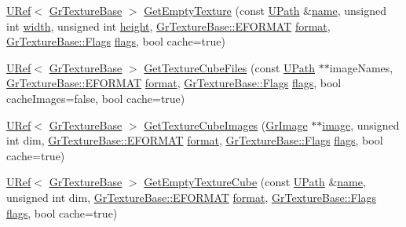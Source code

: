 \begin{CompactItemize}
\item 
\hyperlink{class_u_ref}{URef}$<$ \hyperlink{class_gr_texture_base}{GrTextureBase} $>$ \hyperlink{class_gr_texture_mgr_8cc9e107fe42053e462f63db1f48422c}{GetEmptyTexture} (const \hyperlink{class_u_path}{UPath} \&\hyperlink{glext__bak_8h_bb62efe59ccdd153ce42e1a418352209}{name}, unsigned int \hyperlink{wglext_8h_e6531b1788ca42a9ae8155b0c52e7630}{width}, unsigned int \hyperlink{wglext_8h_b2e63df950c3789599e1e43f477bc9e3}{height}, \hyperlink{class_gr_texture_base_82c606022e93566ba55fe4cd3beb687c}{GrTextureBase::EFORMAT} \hyperlink{glext__bak_8h_e2d3db041c6004a67047659b42f73a44}{format}, \hyperlink{class_gr_texture_base_bee6ecbc7a70ea5f2acab8341a9696b5}{GrTextureBase::Flags} \hyperlink{_u_t_message_8h_0a3c0b351ab09281b662a9ff4f900a53}{flags}, bool cache=true)
\item 
\hyperlink{class_u_ref}{URef}$<$ \hyperlink{class_gr_texture_base}{GrTextureBase} $>$ \hyperlink{class_gr_texture_mgr_cce335f8def2910986ab5b7b2e4a02c6}{GetTextureCubeFiles} (const \hyperlink{class_u_path}{UPath} $\ast$$\ast$imageNames, \hyperlink{class_gr_texture_base_82c606022e93566ba55fe4cd3beb687c}{GrTextureBase::EFORMAT} \hyperlink{glext__bak_8h_e2d3db041c6004a67047659b42f73a44}{format}, \hyperlink{class_gr_texture_base_bee6ecbc7a70ea5f2acab8341a9696b5}{GrTextureBase::Flags} \hyperlink{_u_t_message_8h_0a3c0b351ab09281b662a9ff4f900a53}{flags}, bool cacheImages=false, bool cache=true)
\item 
\hyperlink{class_u_ref}{URef}$<$ \hyperlink{class_gr_texture_base}{GrTextureBase} $>$ \hyperlink{class_gr_texture_mgr_23e061dceb24e232264beef4ad1de42b}{GetTextureCubeImages} (\hyperlink{class_gr_image}{GrImage} $\ast$$\ast$\hyperlink{glext__bak_8h_8943555672bc4b8056204eb92329cafa}{image}, unsigned int dim, \hyperlink{class_gr_texture_base_82c606022e93566ba55fe4cd3beb687c}{GrTextureBase::EFORMAT} \hyperlink{glext__bak_8h_e2d3db041c6004a67047659b42f73a44}{format}, \hyperlink{class_gr_texture_base_bee6ecbc7a70ea5f2acab8341a9696b5}{GrTextureBase::Flags} \hyperlink{_u_t_message_8h_0a3c0b351ab09281b662a9ff4f900a53}{flags}, bool cache=true)
\item 
\hyperlink{class_u_ref}{URef}$<$ \hyperlink{class_gr_texture_base}{GrTextureBase} $>$ \hyperlink{class_gr_texture_mgr_801ca4868a8d15dc00e0d37153596f5c}{GetEmptyTextureCube} (const \hyperlink{class_u_path}{UPath} \&\hyperlink{glext__bak_8h_bb62efe59ccdd153ce42e1a418352209}{name}, unsigned int dim, \hyperlink{class_gr_texture_base_82c606022e93566ba55fe4cd3beb687c}{GrTextureBase::EFORMAT} \hyperlink{glext__bak_8h_e2d3db041c6004a67047659b42f73a44}{format}, \hyperlink{class_gr_texture_base_bee6ecbc7a70ea5f2acab8341a9696b5}{GrTextureBase::Flags} \hyperlink{_u_t_message_8h_0a3c0b351ab09281b662a9ff4f900a53}{flags}, bool cache=true)

\end{CompactItemize}
